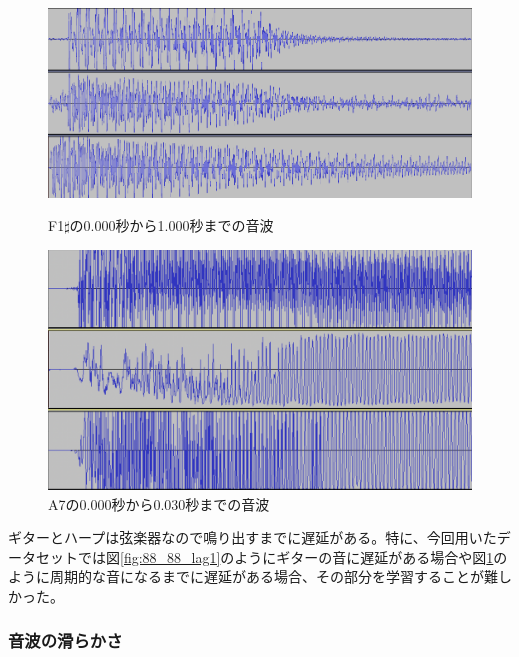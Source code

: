 \begin{figure}[t]
\begin{center}
\begin{minipage}{0.48\hsize}
\begin{center}
\includegraphics[width=0.9\hsize]{figure/88_88/f1s.png}
\caption{F1$\sharp$の0.000秒から1.000秒までの音波}
\label{fig:88_88_lag1}
\end{center}
\end{minipage}
\begin{minipage}{0.48\hsize}
\begin{center}
\includegraphics[width=0.9\hsize]{figure/88_88_det/a7_0_0030.png}
\caption{A7の0.000秒から0.030秒までの音波}
\label{fig:88_88_lag2}
\end{center}
\end{minipage}
\end{center}
\end{figure}

ギターとハープは弦楽器なので鳴り出すまでに遅延がある。特に、今回用いたデータセットでは図\ref{fig:88_88_lag1}のようにギターの音に遅延がある場合や図\ref{fig:88_88_lag2}のように周期的な音になるまでに遅延がある場合、その部分を学習することが難しかった。

\subsubsection{音波の滑らかさ}

